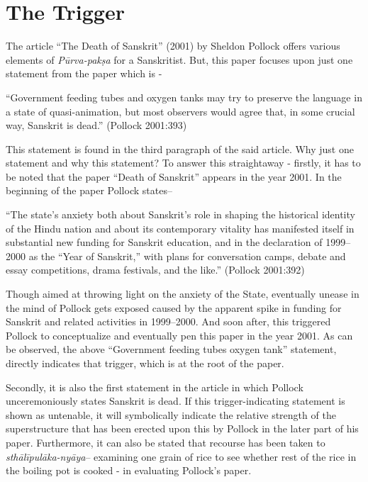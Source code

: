 \section{The Trigger}
 
The article “The Death of Sanskrit” (2001) by Sheldon Pollock offers various elements of {\sl Pūrva-pakṣa} for a Sanskritist. But, this paper focuses upon just one statement from the paper which is - 
\smallskip
\begin{myquote}
\eleven
“Government feeding tubes and oxygen tanks may try to preserve the language in a state of quasi-animation, but most observers would agree that, in some crucial way, Sanskrit is dead.” \hfill(Pollock 2001:393)
\end{myquote}
\smallskip

This statement is found in the third paragraph of the said article. Why just one statement and why this statement?  To answer this straightaway - firstly, it has to be noted that the paper ``Death of Sanskrit'' appears in the year 2001.  In the beginning of the paper Pollock states–
\smallskip

\begin{myquote}
\eleven
“The state’s anxiety both about Sanskrit’s role in shaping the historical identity of the Hindu nation and about its contemporary vitality has manifested itself in substantial new funding for Sanskrit education, and in the declaration of 1999--2000 as the “Year of Sanskrit,” with plans for conversation camps, debate and essay competitions, drama festivals, and the like.” \hfill (Pollock 2001:392)  
\end{myquote}
\smallskip
 
Though aimed at throwing light on the anxiety of the State, eventually unease in the mind of Pollock gets exposed caused by the apparent spike in funding for Sanskrit and related activities in 1999--2000. And soon after, this triggered Pollock to conceptualize and eventually pen this paper in the year 2001. As can be observed, the above “Government feeding tubes oxygen tank” statement, directly indicates that trigger, which is at the root of the paper.

Secondly, it is also the first statement in the article in which Pollock unceremoniously states Sanskrit is dead. If this trigger-indicating statement is shown as untenable, it will symbolically indicate the relative strength of the superstructure that has been erected upon this by Pollock in the later part of his paper. Furthermore, it can also be stated that recourse has been taken to {\sl sthālīpulāka-nyāya}– examining one grain of rice to see whether rest of the rice in the boiling pot is cooked - in evaluating Pollock’s paper.


